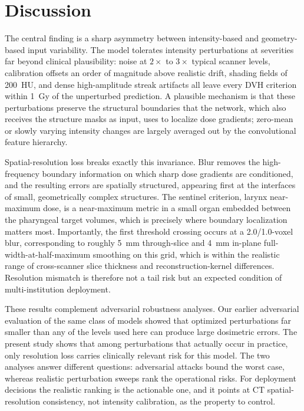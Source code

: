 \documentclass[11pt]{article}
\begin{document}
\section{Discussion}

The central finding is a sharp asymmetry between intensity-based and
geometry-based input variability. The model tolerates intensity perturbations
at severities far beyond clinical plausibility: noise at $2\times$ to
$3\times$ typical scanner levels, calibration offsets an order of magnitude
above realistic drift, shading fields of 200~HU, and dense high-amplitude
streak artifacts all leave every DVH criterion within 1~Gy of the unperturbed
prediction. A plausible mechanism is that these perturbations preserve the
structural boundaries that the network, which also receives the structure
masks as input, uses to localize dose gradients; zero-mean or slowly varying
intensity changes are largely averaged out by the convolutional feature
hierarchy.

Spatial-resolution loss breaks exactly this invariance. Blur removes the
high-frequency boundary information on which sharp dose gradients are
conditioned, and the resulting errors are spatially structured, appearing
first at the interfaces of small, geometrically complex structures. The
sentinel criterion, larynx near-maximum dose, is a near-maximum metric in a
small organ embedded between the pharyngeal target volumes, which is
precisely where boundary localization matters most. Importantly, the first
threshold crossing occurs at a 2.0/1.0-voxel blur, corresponding to roughly
5~mm through-slice and 4~mm in-plane full-width-at-half-maximum smoothing on
this grid, which is within the realistic range of cross-scanner slice
thickness and reconstruction-kernel differences. Resolution mismatch is
therefore not a tail risk but an expected condition of multi-institution
deployment.

These results complement adversarial robustness analyses. Our earlier
adversarial evaluation of the same class of models showed that optimized
perturbations far smaller than any of the levels used here can produce large
dosimetric errors. The present study shows that among perturbations that
actually occur in practice, only resolution loss carries clinically relevant
risk for this model. The two analyses answer different questions: adversarial
attacks bound the worst case, whereas realistic perturbation sweeps rank the
operational risks. For deployment decisions the realistic ranking is the
actionable one, and it points at CT spatial-resolution consistency, not
intensity calibration, as the property to control.
\end{document}
